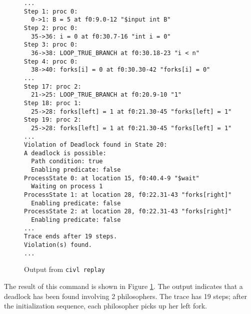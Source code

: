 \begin{figure}
  \begin{small}
\begin{verbatim}
...
Step 1: proc 0: 
  0->1: B = 5 at f0:9.0-12 "$input int B"
Step 2: proc 0: 
  35->36: i = 0 at f0:30.7-16 "int i = 0"
Step 3: proc 0: 
  36->38: LOOP_TRUE_BRANCH at f0:30.18-23 "i < n"
Step 4: proc 0: 
  38->40: forks[i] = 0 at f0:30.30-42 "forks[i] = 0"
...
Step 17: proc 2: 
  21->25: LOOP_TRUE_BRANCH at f0:20.9-10 "1"
Step 18: proc 1: 
  25->28: forks[left] = 1 at f0:21.30-45 "forks[left] = 1"
Step 19: proc 2: 
  25->28: forks[left] = 1 at f0:21.30-45 "forks[left] = 1"
...
Violation of Deadlock found in State 20:
A deadlock is possible:
  Path condition: true
  Enabling predicate: false
ProcessState 0: at location 15, f0:40.4-9 "$wait"
  Waiting on process 1
ProcessState 1: at location 28, f0:22.31-43 "forks[right]"
  Enabling predicate: false
ProcessState 2: at location 28, f0:22.31-43 "forks[right]"
  Enabling predicate: false
...
Trace ends after 19 steps.
Violation(s) found.
...
\end{verbatim}
  \end{small}
  \caption{Output from \texttt{civl replay}}
  \label{fig:diningReplay}
\end{figure}

The result of this command is shown in Figure \ref{fig:diningReplay}.
The output indicates that a deadlock has been found involving 2
philosophers. The trace has 19 steps; after the initialization
sequence, each philosopher picks up her left fork.
